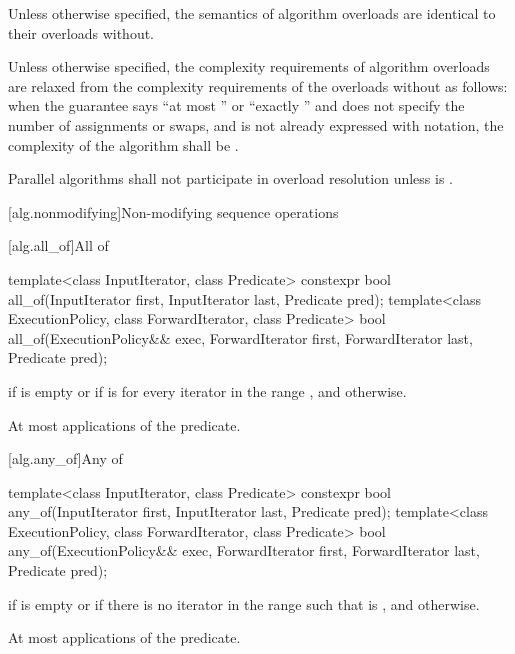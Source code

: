 \pnum
Unless otherwise specified, the semantics of  algorithm
overloads are identical to their overloads without.

\pnum
Unless otherwise specified, the complexity requirements of 
algorithm overloads are relaxed from the complexity requirements of the overloads
without as follows:
when the guarantee says ``at most '' or ``exactly ''
and does not specify the number of assignments or swaps, and 
is not already expressed with  \bigoh{} notation, the complexity of the algorithm
shall be .

\pnum
Parallel algorithms shall not participate in overload resolution unless
 is .

[alg.nonmodifying]{Non-modifying sequence operations}

[alg.all_of]{All of}

%
\begin{itemdecl}
template<class InputIterator, class Predicate>
  constexpr bool all_of(InputIterator first, InputIterator last, Predicate pred);
template<class ExecutionPolicy, class ForwardIterator, class Predicate>
  bool all_of(ExecutionPolicy&& exec, ForwardIterator first, ForwardIterator last,
              Predicate pred);
\end{itemdecl}

\begin{itemdescr}
\pnum
\returns {} if
 is empty or if
 is  for every iterator  in the range , and  otherwise.

\pnum
\complexity At most  applications of the predicate.
\end{itemdescr}

[alg.any_of]{Any of}

%
\begin{itemdecl}
template<class InputIterator, class Predicate>
  constexpr bool any_of(InputIterator first, InputIterator last, Predicate pred);
template<class ExecutionPolicy, class ForwardIterator, class Predicate>
  bool any_of(ExecutionPolicy&& exec, ForwardIterator first, ForwardIterator last,
              Predicate pred);
\end{itemdecl}

\begin{itemdescr}
\pnum
\returns {} if  is empty or
if there is no iterator  in the range
 such that  is , and  otherwise.

\pnum
\complexity At most  applications of the predicate.
\end{itemdescr}

